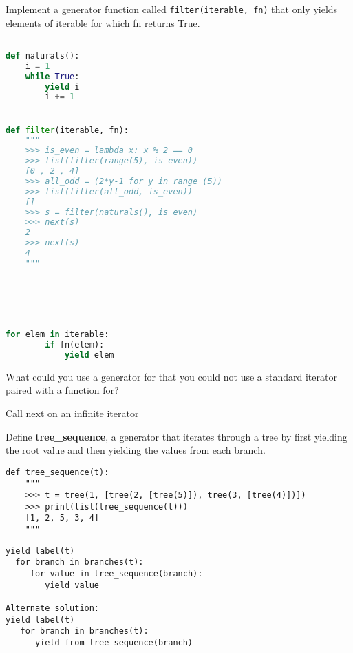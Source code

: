 \question
Implement a generator function called \texttt{filter(iterable, fn)} that only yields
elements of iterable for which fn returns True.

\begin{lstlisting}[language=Python]

def naturals(): 
	i = 1 
	while True: 
		yield i 
		i += 1


def filter(iterable, fn):
    """
    >>> is_even = lambda x: x % 2 == 0
    >>> list(filter(range(5), is_even))
    [0 , 2 , 4]
    >>> all_odd = (2*y-1 for y in range (5))
    >>> list(filter(all_odd, is_even))
    []
    >>> s = filter(naturals(), is_even)
    >>> next(s)
    2
    >>> next(s)
    4
    """
    
    
    
    
    

\end{lstlisting}
\begin{solution}[.75in]
\begin{lstlisting}[language=Python]
    for elem in iterable:
        if fn(elem):
            yield elem
\end{lstlisting}
\end{solution}

\question What could you use a generator for that you could not use a standard iterator paired with a function for? 
\begin{solution}[.75in]
Call next on an infinite iterator
\end{solution}
\newpage


\question
Define \textbf{tree\_sequence}, a generator that iterates through a tree by first yielding the root value and then yielding the values from each branch.


\begin{lstlisting}
def tree_sequence(t):
	"""
	>>> t = tree(1, [tree(2, [tree(5)]), tree(3, [tree(4)])])
	>>> print(list(tree_sequence(t)))
	[1, 2, 5, 3, 4]
	"""

\end{lstlisting}
\begin{solution}
\begin{verbatim}
yield label(t)
  for branch in branches(t):
     for value in tree_sequence(branch):
        yield value

Alternate solution:
yield label(t)
   for branch in branches(t):
      yield from tree_sequence(branch)

\end{verbatim}
\end{solution}


